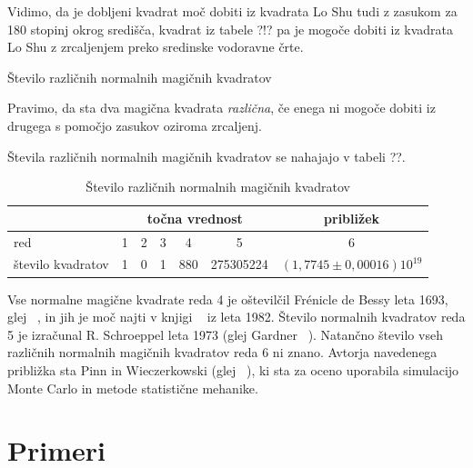 \documentclass[a4paper,12pt]{article}
\theoremstyle{plain}
\theoremstyle{definition}
\newtheorem{definicija}{Definicija}
\begin{document}
Vidimo, da je dobljeni kvadrat moč dobiti iz kvadrata Lo Shu tudi z zasukom za
180 stopinj okrog središča, kvadrat iz tabele ?!? pa je mogoče dobiti
iz kvadrata Lo Shu z zrcaljenjem preko sredinske vodoravne črte.

Število različnih normalnih magičnih kvadratov

      Pravimo, da sta dva magična kvadrata \emph{različna}, če enega ni mogoče dobiti
      iz drugega s pomočjo zasukov oziroma zrcaljenj.

Števila različnih normalnih magičnih kvadratov se nahajajo v tabeli ??.

\begin{table}
   \centering
   \caption{Število različnih normalnih magičnih kvadratov}
   \label{table:stevila}

   \begin{tabular}{lcccccc}
      \toprule   
       & \multicolumn{5}{c}{točna vrednost} & približek \\
      \midrule  
      red & 1 & 2 & 3 & 4 & 5 & 6 \\
      število kvadratov & 1 & 0 & 1 & 880 & 275305224 & $(1{,}7745 \pm 0{,}00016)10^ {19}$ \\
      \toprule  
   \end{tabular}

\end{table}      

Vse normalne magične kvadrate reda 4 je oštevilčil Frénicle de Bessy
leta 1693, glej ~\cite{bessy}, in jih je moč najti v knjigi ~\cite{berlekamp}
iz leta 1982. Število normalnih kvadratov reda 5 je izračunal
R. Schroeppel leta 1973 (glej Gardner ~\cite{gardner}).
Natančno število vseh različnih normalnih magičnih kvadratov reda 6 ni znano.
Avtorja navedenega približka sta Pinn in Wieczerkowski (glej ~\cite{pinn}), ki
sta za oceno uporabila simulacijo Monte Carlo in metode statistične mehanike.


\section{Primeri}
\end{document}
